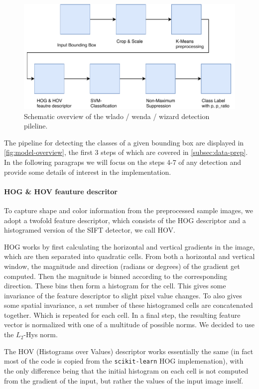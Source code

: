 \documentclass[11pt]{article}
\begin{document}
\begin{figure}
    \centering
    \includegraphics[width=0.9\linewidth]{figures/model_overview} 
    \caption{Schematic overview of the wlado / wenda / wizard detection pileline.}
    \label{fig:model-overview}
\end{figure}

The pipeline for detecting the classes of a given bounding box are displayed in \autoref{fig:model-overview},
the first 3 steps of which are covered in \autoref{subsec:data-prep}. In the following paragraps we will focus on the
steps 4-7 of any detection and provide some details of interest in the implementation.

\paragraph{HOG \& HOV feauture descritor}
To capture shape and color information from the preprocessed sample images, we adopt a twofold feature descriptor, 
which consists of the HOG descriptor and a histogramed version of the SIFT detector, we call HOV.

HOG works by first calculating the horizontal and vertical gradients in the image, which are then separated into
quadratic cells. From both a horizontal and vertical window, the magnitude and direction (radians or degrees) of the gradient get computed.
Then the magnitude is binned according to the corresponding direction. These bins then form a histogram for the cell.
This gives some invariance of the feature descriptor to slight pixel value changes. 
To also gives some spatial invariance, a set number of these histogramed cells are concatenated together. Which is repeated for each cell.
In a final step, the resulting feature vector is normalized with one of a multitude of possible norms. We decided to use the \( L_2 \)-Hys norm.

The HOV (Histograms over Values) descriptor works essentially the same (in fact most of the code is copied from the \verb|scikit-learn| HOG implemenation),
with the only difference being that the initial histogram on each cell is not computed from the gradient of the input,
but rather the values of the input image inself.
\end{document}
